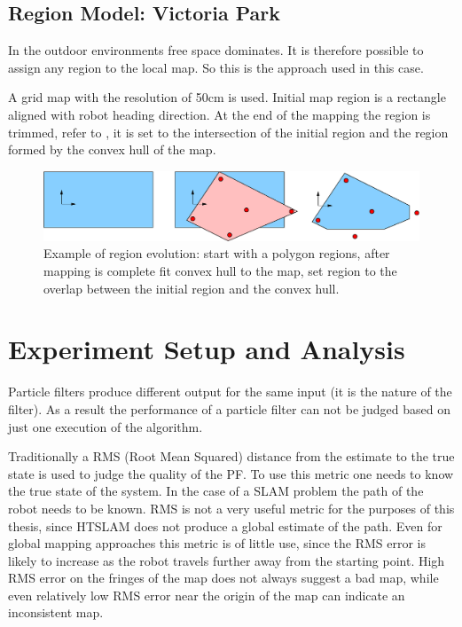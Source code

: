 \subsection{Region Model: Victoria Park}

In the outdoor environments free space dominates. It is therefore
possible to assign any region to the local map. So this is the
approach used in this case.

A grid map with the resolution of 50cm is used. Initial map region is
a rectangle aligned with robot heading direction. At the end of the
mapping the region is trimmed, refer to
, it is set to the intersection
of the initial region and the region formed by the convex hull of the
map.

\begin{figure}[htbp]
  \centering
  \includegraphics[width=14cm]{Pics/fig_convex_reg}
  \caption{Example of region evolution: start with a polygon regions,
  after mapping is complete fit convex hull to the map, set region to
  the overlap between the initial region and the convex hull.}
  \label{fig:initial_region_vision}
\end{figure}

\section{Experiment Setup and Analysis}

Particle filters produce different output for the same input (it is
the nature of the filter). As a result the performance of a particle
filter can not be judged based on just one execution of the
algorithm. 


Traditionally a RMS (Root Mean Squared) distance from the estimate to
the true state is used to judge the quality of the PF. To use this
metric one needs to know the true state of the system. In the case of
a SLAM problem the path of the robot needs to be known. RMS is not a
very useful metric for the purposes of this thesis, since HTSLAM does
not produce a global estimate of the path. Even for global mapping
approaches this metric is of little use, since the RMS error is likely
to increase as the robot travels further away from the starting point.
High RMS error on the fringes of the map does not always suggest a bad
map, while even relatively low RMS error near the origin of the map
can indicate an inconsistent map.


